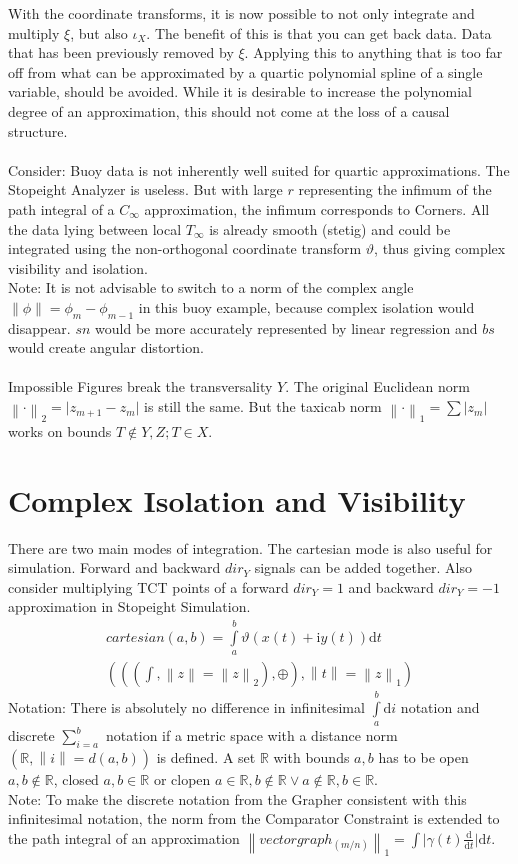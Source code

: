 \documentclass{report}
\newcommand\norm[1]{\left\lVert#1\right\rVert}
\begin{document}
With the coordinate transforms, it is now possible to not only integrate and multiply $\xi$, but also $\iota_{X}$. The benefit of this is that you can get back data. Data that has been previously removed by $\xi$. Applying this to anything that is too far off from what can be approximated by a quartic polynomial spline of a single variable, should be avoided. While it is desirable to increase the polynomial degree of an approximation, this should not come at the loss of a causal structure.\\\\
Consider: Buoy data is not inherently well suited for quartic approximations. The Stopeight Analyzer is useless. But with large $r$ representing the infimum of the path integral of a $C_{\infty}$ approximation, the infimum corresponds to Corners. All the data lying between local $T_{\infty}$ is already smooth (stetig) and could be integrated using the non-orthogonal coordinate transform $\vartheta$, thus giving complex visibility and isolation.\\
Note: It is not advisable to switch to a norm of the complex angle $\norm{\phi} = \phi_{m}-\phi_{m-1}$ in this buoy example, because complex isolation would disappear. $sn$ would be more accurately represented by linear regression and $bs$ would create angular distortion.\\\\
Impossible Figures break the transversality $Y$. The original Euclidean norm $\norm{\cdot}_2 = \lvert z_{m+1}-z_{m} \rvert$ is still the same. But the taxicab norm $\norm{\cdot}_1 = \sum \lvert z_{m} \rvert$ works on bounds $T \not \in Y,Z; T \in X$.

\section{Complex Isolation and Visibility}
There are two main modes of integration. The cartesian mode is also useful for simulation. Forward and backward $dir_{Y}$ signals can be added together. Also consider multiplying TCT points of a forward $dir_{Y}=1$ and backward $dir_{Y}=-1$ approximation in Stopeight Simulation.
\begin{align}
cartesian(a,b)=\int \limits _{a}^{b} \vartheta (x(t)+\mathrm{i}y(t)) \mathrm{d} t\\
(((\int,\norm{z}=\norm{z}_2),\oplus),\norm{t}=\norm{z}_1)
\end{align}
Notation: There is absolutely no difference in infinitesimal $\int \limits _{a}^{b} \mathrm{d}i$ notation and discrete $\sum  \limits _{i=a}^{b}$ notation if a metric space with a distance norm $(\mathbb{R},\norm{i}=d(a,b))$ is defined. A set $\mathbb{R}$ with bounds $a,b$ has to be open $a,b \not \in \mathbb{R}$, closed $a,b \in \mathbb{R}$ or clopen $a \in \mathbb{R}, b \not \in \mathbb{R} \lor a \not \in \mathbb{R},b \in \mathbb{R}$.\\
Note: To make the discrete notation from the Grapher consistent with this infinitesimal notation, the norm from the Comparator Constraint is extended to the path integral of an approximation $\norm{vectorgraph_{(m/n)}}_1=\int \lvert \gamma (t) \frac{\mathrm{d}}{\mathrm{d}t} \rvert \mathrm{d}t$.
\end{document}
